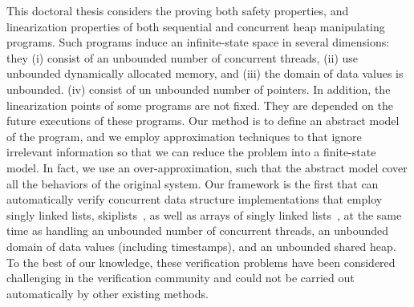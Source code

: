 This doctoral thesis considers the proving both safety properties, and linearization properties of
both sequential and concurrent heap manipulating programs.
Such programs induce an infinite-state space in several dimensions:
they %
(i) consist of an unbounded number of concurrent threads, %
(ii) use unbounded dynamically allocated memory, and %
(iii) the domain of data values is unbounded. %
(iv) consist of un unbounded number of pointers. 
In addition, the linearization points of some programs are not fixed. They are depended on the future executions of these programs. 
Our method is to define an abstract model of the program, and we employ approximation techniques to that ignore irrelevant information so that we can reduce the problem into a finite-state model. In fact, we use an over-approximation, such that the abstract model cover all the behaviors of the original system.  Our framework is the first that
can automatically verify concurrent data structure implementations that employ
singly linked lists, skiplists~\cite{Fomitchev:2004,ArtOfMpP,Sundell:2005},
as well as arrays of singly linked lists~\cite{ts-stack},
at the same time as handling an unbounded
number of concurrent threads, an unbounded domain of data values
(including timestamps), and an unbounded shared heap. To the best of our knowledge, these verification problems have been
considered challenging in the verification community and
could not be carried out automatically by other existing methods.




